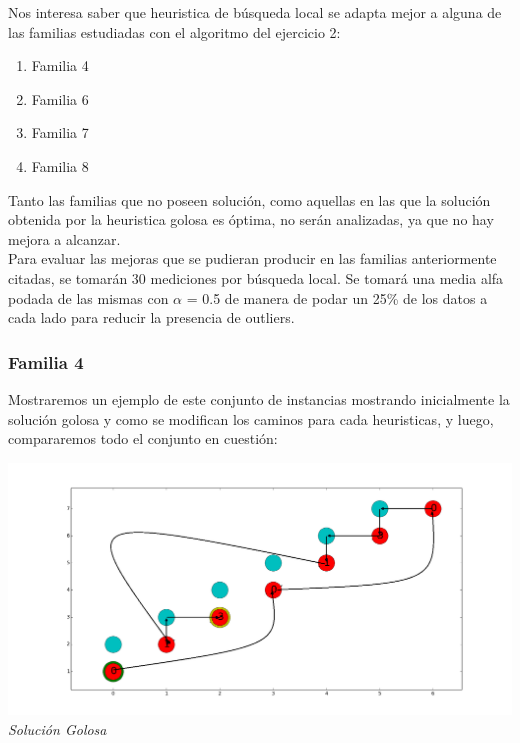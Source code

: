 Nos interesa saber que heuristica de búsqueda local se adapta mejor a alguna de las familias estudiadas con el algoritmo del ejercicio 2:

\begin{enumerate}
\item Familia 4
\item Familia 6
\item Familia 7
\item Familia 8
\end{enumerate}

Tanto las familias que no  poseen solución, como aquellas en las que la solución obtenida por la heuristica golosa es óptima, no serán analizadas, ya que no hay mejora a alcanzar.\\
 
Para evaluar las mejoras que se pudieran producir en las familias anteriormente citadas, se tomarán 30 mediciones por búsqueda local. Se tomará una media alfa podada de las mismas con $\alpha$ = 0.5 de manera de podar un 25\% de los datos a cada lado para reducir la presencia de outliers.



\subsubsection*{Familia 4}

Mostraremos un ejemplo de este conjunto de instancias mostrando inicialmente la soluci\'on golosa y como se modifican los caminos para cada heuristicas, y luego, compararemos todo el conjunto en cuesti\'on:

\vspace*{0.3cm} \vspace*{0.3cm}
  \begin{center}
 \includegraphics[scale=0.3]{./EJ3/gym0goloso.png}\\
 {            \textit{Soluci\'on Golosa}}
  \end{center}
  \vspace*{0.3cm}

